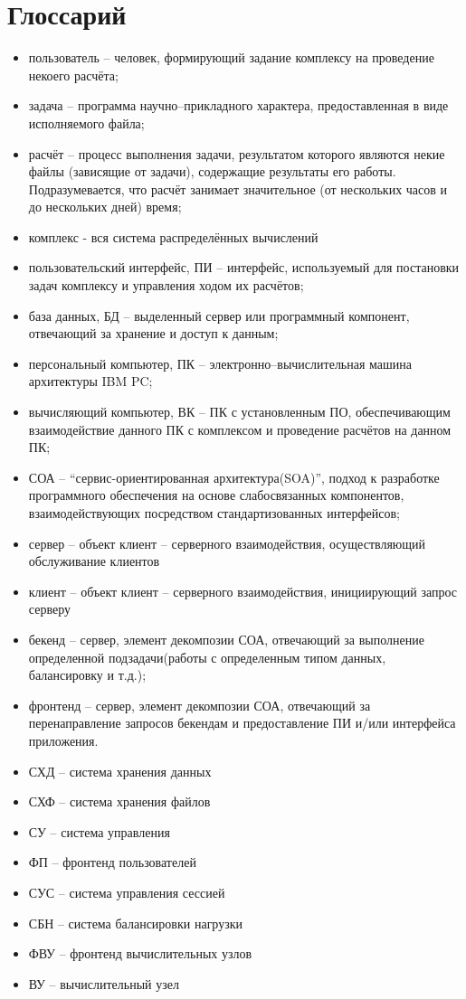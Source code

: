 \documentclass[a4paper,12pt]{report}
\numberwithin{equation}{section}
\begin{document}
  \section*{Глоссарий}
  \begin{itemize}
    \item пользователь -- человек, формирующий задание комплексу на проведение некоего расчёта;
    \item задача -- программа научно--прикладного характера, предоставленная в виде исполняемого файла;
    \item расчёт -- процесс выполнения задачи, результатом которого являются некие файлы (зависящие от задачи), содержащие результаты его работы. Подразумевается, что расчёт занимает значительное (от нескольких часов и до нескольких дней) время;
    \item комплекс - вся система распределённых вычислений
    \item пользовательский интерфейс, ПИ -- интерфейс, используемый для постановки задач комплексу и управления ходом их расчётов;
    \item база данных, БД -- выделенный сервер или программный компонент, отвечающий за хранение и доступ к данным;
    \item персональный компьютер, ПК -- электронно--вычислительная машина архитектуры IBM PC;
    \item вычисляющий компьютер, ВК -- ПК с установленным ПО, обеспечивающим взаимодействие данного ПК с комплексом и проведение расчётов на данном ПК;
    \item СОА -- ``сервис-ориентированная архитектура(SOA)'', подход к разработке программного обеспечения на основе слабосвязанных компонентов, взаимодействующих посредством стандартизованных интерфейсов;
    \item сервер -- объект клиент -- серверного взаимодействия, осуществляющий обслуживание клиентов
    \item клиент -- объект клиент -- серверного взаимодействия, инициирующий запрос серверу
    \item бекенд -- сервер, элемент декомпозии СОА, отвечающий за выполнение определенной подзадачи(работы с определенным типом данных, балансировку и т.д.);
    \item фронтенд -- сервер, элемент декомпозии СОА, отвечающий за перенаправление запросов бекендам и предоставление ПИ и/или интерфейса приложения.
    \item СХД -- система хранения данных
    \item СХФ -- система хранения файлов
    \item СУ -- система управления
    \item ФП -- фронтенд пользователей
    \item СУС -- система управления сессией
    \item СБН -- система балансировки нагрузки
    \item ФВУ -- фронтенд вычислительных узлов
    \item ВУ -- вычислительный узел
  \end{itemize}
  
\end{document}
